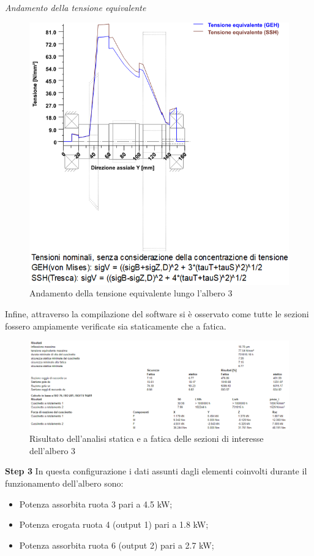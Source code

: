 \emph{Andamento della tensione equivalente}
\begin{figure}[h]
    \centering
    \includegraphics[scale=0.5]{Immagini/Tensioni2Albero3.png}
    \caption{Andamento della tensione equivalente lungo l'albero 3}
   \label{fig:Tensioni2Albero3}
\end{figure}
\newpage
Infine, attraverso la compilazione del software si è osservato come tutte le sezioni fossero ampiamente verificate sia staticamente che a fatica.
\begin{figure}[h]
    \centering
    \includegraphics[scale=0.5]{Immagini/Risultati2Albero3.png}
    \caption{Risultato dell'analisi statica e a fatica delle sezioni di interesse dell'albero 3}
    \label{fig:Risultat21Albero3}
\end{figure}

\textbf{Step 3}
In questa configurazione i dati assunti dagli elementi coinvolti durante il funzionamento dell'albero sono:
\begin{itemize}
    \item Potenza assorbita ruota 3 pari a 4.5 kW;
    \item Potenza erogata ruota 4 (output 1) pari a 1.8 kW;
    \item Potenza assorbita ruota 6 (output 2) pari a 2.7 kW;
\end{itemize}

